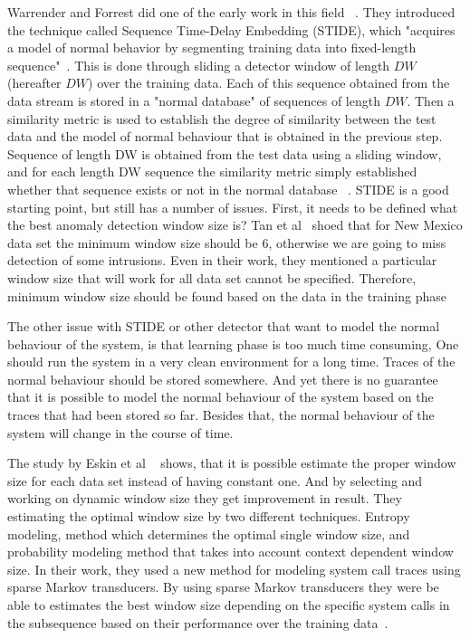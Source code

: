 Warrender and Forrest did one of the early work in this field ~\cite{Warrender1999}. They introduced the technique called Sequence Time-Delay Embedding (STIDE), which "acquires a model of normal behavior by segmenting training data into fixed-length sequence"~\cite{Warrender1999}. This is done through sliding a detector window of length $DW$ (hereafter $DW$) over the training data. Each of this sequence obtained from the data stream is stored in a "normal database" of sequences of length $DW$. Then a similarity metric is used to establish the degree of similarity between the test data and the model of normal behaviour that is obtained in the previous step. Sequence of length DW is obtained from the test data using a sliding window, and for each length DW sequence the similarity metric simply established whether that sequence exists or not in the normal database ~\cite{Tan2002}.
STIDE is a good starting point, but still has a number of issues. First, it needs to be defined what the best anomaly detection window size is? Tan et al~\cite{Tan2002} shoed that for New Mexico data set the minimum window size should be $6$, otherwise we are going to miss detection of some intrusions. Even in their work, they mentioned a particular window size that will work for all data set cannot be specified. Therefore, minimum window size should be found based on the data in the training phase

The other issue with STIDE or other detector that want to model the normal behaviour of the system, is that learning phase is too much time consuming, One should run the system in a very clean environment for a long time. Traces of the normal behaviour should be stored somewhere. And yet there is no guarantee that it is possible to model the normal behaviour of the system based on the traces that had been stored so far. Besides that, the normal behaviour of the system will change in the course of time.

The study by Eskin et al ~\cite{Creech2014} shows, that it is possible estimate the proper window size for each data set instead of having constant one. And by selecting and working on dynamic window size they get improvement in result. They estimating the optimal window size by two different techniques. Entropy modeling, method which determines the optimal single window size, and probability modeling method that takes into account context dependent window size. In their work, they used a new method for modeling system call traces using sparse
Markov transducers. By using sparse
Markov transducers they were be able to estimates the best window size depending on the
specific system calls in the subsequence based on their performance over the training data~\cite{Creech2014}.



